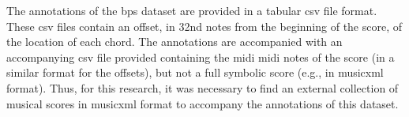 

The annotations of the \gls{bps} dataset are provided in a
tabular \gls{csv} file format. These \gls{csv} files contain
an offset, in 32nd notes from the beginning of the score,
of the location of each chord. The annotations are
accompanied with an accompanying \gls{csv} file provided
containing the midi \gls{midi} notes of the score (in a
similar format for the offsets), but not a full symbolic
score (e.g., in \gls{musicxml} format). Thus, for this
research, it was necessary to find an external collection of
musical scores in \gls{musicxml} format to accompany the
annotations of this dataset.